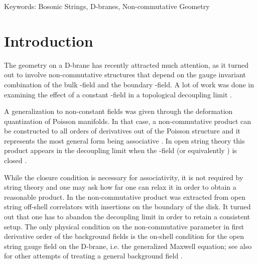 \documentclass[a4paper,11pt]{article}               \def\new#1\endnew{{\bf #1}}
\providecommand {\cF} {{\cal F}}
\begin{document}
Keywords: Bosonic Strings, D-branes, Non-commutative Geometry \\[7pt]

\clearpage
\setcounter{page}{1}


\section{Introduction}
\label{sec:intro}

The geometry on a D-brane has recently attracted much attention, as it 
turned out to involve non-commutative structures that depend on 
the gauge invariant combination \myHighlight{$\cF = B + (2\pi\alpha')dA$}\coordHE{} of the bulk 
\coordHE{}-field and the boundary \coordHE{}-field.
A lot of work was done in examining the effect of a constant
\coordHE{}-field in a topological decoupling limit
\cite{Schomerus:1999ug,Seiberg:1999vs,Ardalan:1999ce,Ardalan:2000av,Chu:1999qz}.

A generalization to non-constant fields was given through the 
deformation quantization of Poisson manifolds. In that
case, a non-commutative product can be constructed to all orders
of derivatives out of the Poisson structure \myHighlight{$\Theta$}\coordHE{} and it 
represents the most general form being associative
\cite{Kontsevich:1997vb}. In open string 
theory this product appears in the decoupling limit when the \coordHE{}-field
(or equivalently \myHighlight{$\cF$}\coordHE{}) is closed \cite{Cattaneo:2000fm}.

While the closure condition is necessary for associativity, it is
not required by
string theory and one may ask how far one can relax it in order to 
obtain a reasonable product. In \cite{Herbst:2001ai}
the non-commutative product was extracted from open string off-shell
correlators with insertions on the boundary of the disk.
It turned out that one has to abandon the decoupling limit in order to
retain a consistent setup. The only physical 
condition on the non-commutative parameter \myHighlight{$\Theta$}\coordHE{}
in first derivative order of the background fields is the on-shell 
condition for the open
string gauge field \coordHE{} on the D-brane, i.e. the generalized Maxwell
equation; see also \cite{Cornalba:2002sm,Ho:2000fv,Chu:2000gi,Ho:2001qk} 
for other attempts of treating a general background field \coordHE{}.
\end{document}
